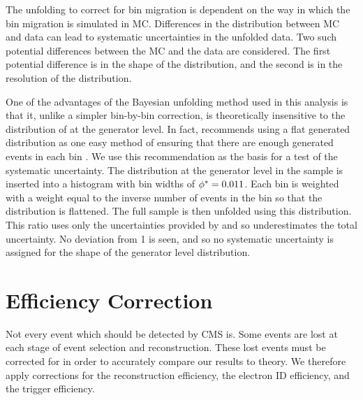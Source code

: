The unfolding to correct for bin migration is dependent on the way in which the
bin migration is simulated in MC. Differences in the \phistar distribution
between MC and data can lead to systematic uncertainties in the unfolded data.
Two such potential differences between the MC and the data are considered. The
first potential difference is in the shape of the \phistar distribution, and
the second is in the resolution of the \phistar distribution.

One of the advantages of the Bayesian unfolding method used in this analysis is
that it, unlike a simpler bin-by-bin correction, is theoretically insensitive
to the distribution of \phistar at the generator level. In fact, \DAgostini
recommends using a flat generated distribution as one easy method of ensuring
that there are enough generated events in each bin \cite{dagostini_1995}.
 We use this recommendation as the basis for
a test of the systematic uncertainty. The \phistar distribution at the
generator level in the \MADGRAPH sample is inserted into a histogram with bin
widths of $\phi^{*} = 0.011$. Each bin is weighted with a weight equal to the
inverse number of events in the bin so that the distribution is flattened. The
full \POWHEG sample is then unfolded using this \MADGRAPH distribution.
 This ratio uses only the
uncertainties provided by \RooUnfold and so underestimates the total
uncertainty. No deviation from \num{1} is seen, and so no systematic
uncertainty is assigned for the shape of the generator level \phistar
distribution.


\section{Efficiency Correction}

Not every event which should be detected by CMS is. Some events are lost at
each stage of event selection and reconstruction. These lost events must be
corrected for in order to accurately compare our results to theory. We
therefore apply corrections for the reconstruction efficiency, the electron ID
efficiency, and the trigger efficiency.

